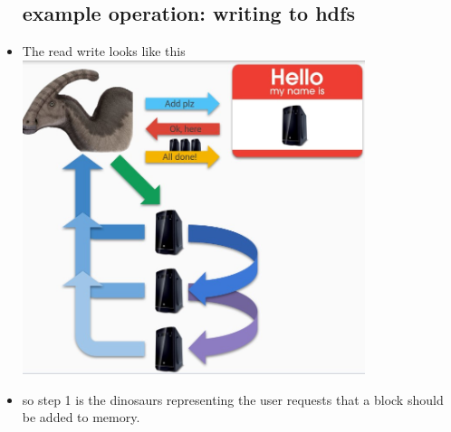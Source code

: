 \documentclass{article}
\begin{document}
\begin{itemize}
\subsection{example operation: writing to hdfs}
\item The read write looks like this \\ \includegraphics[width=10cm]{lecture notes/week_4/immages/l4_2.jpg}
\item so step 1 is the dinosaurs representing the user requests that a block should be added to memory.
\begin{itemize}
    

\end{itemize}
\end{itemize}
\end{document}

